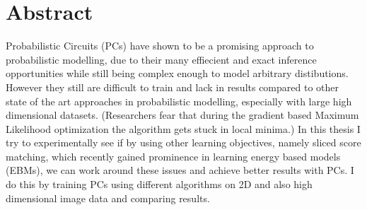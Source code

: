 \chapter{Abstract}

Probabilistic Circuits (PCs) have shown to be a promising approach to probabilistic modelling, due to their many 
effiecient and exact inference opportunities while still being complex enough to model arbitrary distibutions. 
However they still are difficult to train and lack in results compared to other state of the
art approaches in probabilistic modelling, especially with large high dimensional datasets. 
(Researchers fear that during the gradient based Maximum Likelihood optimization the algorithm gets stuck in local 
minima.) 
In this thesis I try to experimentally see if by using other learning objectives, namely sliced score matching, which 
recently gained prominence in learning energy based models (EBMs), we can work around these issues and achieve better results 
with PCs. 
I do this by training PCs using different algorithms on 2D and also high dimensional image data and comparing
results. 
